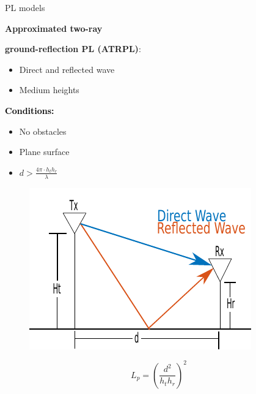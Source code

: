 \documentclass[10pt]{beamer}
\begin{document}
\begin{frame}{PL models}
\begin{minipage}{.45\textwidth}
\raggedright\textcolor{thomasred}{\textbf{Approximated two-ray}}\\
\raggedright\textcolor{thomasred}{\textbf{ground-reflection PL (ATRPL)}:}
\begin{itemize}
\item Direct and reflected wave
\item Medium heights
\end{itemize} 

\vspace{1em}
\textcolor{black}{\textbf{Conditions:}}
\begin{itemize}
\item No obstacles
\item Plane surface
\item $d > \frac{4\pi \cdot h_t h_r }{\lambda}$
\end{itemize}

\end{minipage}
\begin{minipage}{0.5\textwidth}
\begin{figure}[!htbp]
 \centering
  \includegraphics[width = \columnwidth]{figures/two_ray_illu.pdf}
  \end{figure}
\end{minipage}

\vspace{1em}
\begin{equation*}
L_{p} = \left(\frac{d^2}{h_t h_r}\right)^2
\label{two_ray_model}
\end{equation*}
\end{frame}
\end{document}
